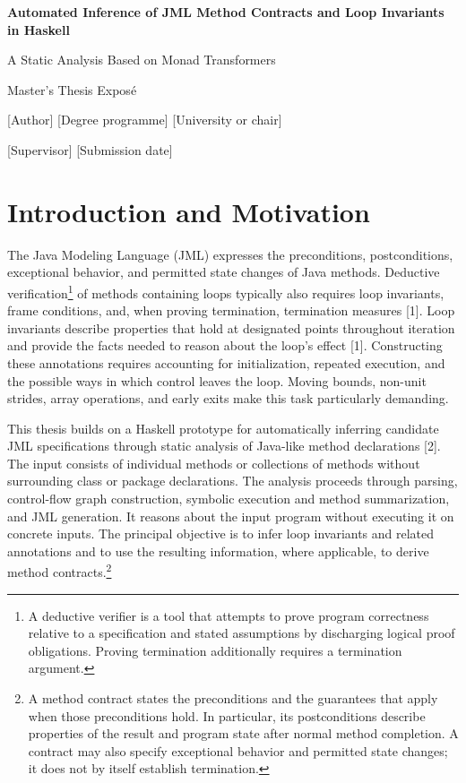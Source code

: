 \documentclass[11pt,a4paper]{article}
\begin{document}
\begin{center}

{\LARGE\bfseries Automated Inference of JML Method Contracts and Loop Invariants in Haskell\par}\vspace{0.4em}
{\large A Static Analysis Based on Monad Transformers\par}\vspace{0.8em}
{\small Master's Thesis Exposé\par}
{\small [Author] \textperiodcentered{} [Degree programme] \textperiodcentered{} [University or chair]\par}
{\small [Supervisor] \textperiodcentered{} [Submission date]\par}
\end{center}
\section{Introduction and Motivation}
The Java Modeling Language (JML) expresses the preconditions, postconditions, exceptional behavior, and permitted state changes of Java methods. Deductive verification\footnote{A deductive verifier is a tool that attempts to prove program correctness relative to a specification and stated assumptions by discharging logical proof obligations. Proving termination additionally requires a termination argument.} of methods containing loops typically also requires loop invariants, frame conditions, and, when proving termination, termination measures [1]. Loop invariants describe properties that hold at designated points throughout iteration and provide the facts needed to reason about the loop's effect [1]. Constructing these annotations requires accounting for initialization, repeated execution, and the possible ways in which control leaves the loop. Moving bounds, non-unit strides, array operations, and early exits make this task particularly demanding.

This thesis builds on a Haskell prototype for automatically inferring candidate JML specifications through static analysis of Java-like method declarations [2]. The input consists of individual methods or collections of methods without surrounding class or package declarations. The analysis proceeds through parsing, control-flow graph construction, symbolic execution and method summarization, and JML generation. It reasons about the input program without executing it on concrete inputs. The principal objective is to infer loop invariants and related annotations and to use the resulting information, where applicable, to derive method contracts.\footnote{A method contract states the preconditions and the guarantees that apply when those preconditions hold. In particular, its postconditions describe properties of the result and program state after normal method completion. A contract may also specify exceptional behavior and permitted state changes; it does not by itself establish termination.}
\end{document}
